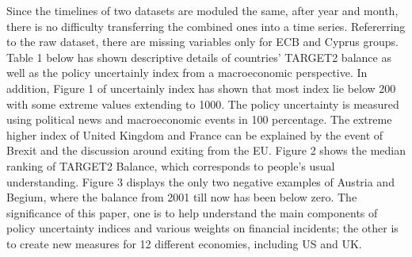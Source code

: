 \documentclass[12pt]{article}
\begin{document}
Since the timelines of two datasets are moduled the same, after year and month, there is no difficulty transferring the combined ones into a time series. Refererring to the raw dataset, there are missing variables only for ECB and Cyprus groups. Table 1 below has shown descriptive details of countries' TARGET2 balance as well as the policy uncertainly index from a macroeconomic perspective. In addition, Figure 1 of uncertainly index has shown that most index lie below 200 with some extreme values extending to 1000. The policy uncertainty is measured using political news and macroeconomic events in 100 percentage. The extreme higher index of United Kingdom and France can be explained by the event of Brexit and the discussion around exiting from the EU. Figure 2 shows the median ranking of TARGET2 Balance, which corresponds to people's usual understanding. Figure 3 displays the only two negative examples of Austria and Begium, where the balance from 2001 till now has been below zero. The significance of this paper, one is to help understand the main components of policy uncertainty indices and various weights on financial incidents; the other is to create new measures for 12 different economies, including US and UK. 
\end{document}
